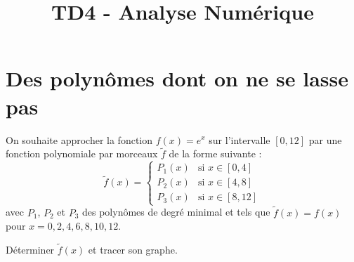 \documentclass[10pt]{article}
\title{TD4 - Analyse Numérique}
\author{}
\date{}
\begin{document}
\sffamily
\maketitle

\section*{Des polynômes dont on ne se lasse pas}
On souhaite approcher la fonction $f(x)=e^x$ sur l'intervalle $[0,12]$ par une fonction polynomiale par morceaux $\tilde{f}$ de la forme suivante : 
\[
\tilde{f}(x) = \begin{cases}
    P_1(x) & \text{si } x \in [0, 4] \\
    P_2(x) & \text{si } x \in [4, 8] \\
    P_3(x) & \text{si } x \in [8, 12]
\end{cases}
\]
avec $P_1$, $P_2$ et $P_3$ des polynômes de degré minimal et tels que $\tilde{f}(x)=f(x)$ pour $x=0, 2, 4, 6, 8, 10, 12$. 
\vspace{0.5em}

Déterminer $\tilde{f}(x)$ et tracer son graphe. 
\end{document}
